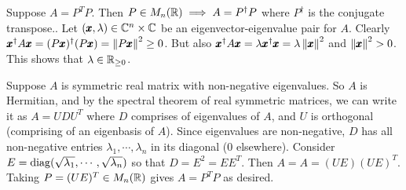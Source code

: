 \begin{sol}
Suppose $A=P^TP$. Then $P\in M_n(\mathbb{R})\implies A=P^\dagger P$ where $P^\dagger$ is the conjugate transpose.. Let $(\pmb x,\lambda)\in\mathbb{C}^n\times \mathbb{C}$ be an eigenvector-eigenvalue pair for $A$. Clearly $\pmb x^\dagger A \pmb x = (P\pmb x)^\dagger (P\pmb x) = \left\| P\pmb x \right\|_{}^2 \geq 0$. But also $\pmb x^\dagger A \pmb x = \lambda \pmb x^\dagger \pmb x = \lambda \left\| \pmb x \right\|_{}^2$ and $\left\| \pmb x \right\|_{}^2> 0$. This shows that $\lambda \in \mathbb{R}_{\geq 0}$.

Suppose $A$ is symmetric real matrix with non-negative eigenvalues. So $A$ is Hermitian, and by the spectral theorem of real symmetric matrices, we can write it as $A=UD U^T$ where $D$ comprises of eigenvalues of $A$, and $U$ is orthogonal (comprising of an eigenbasis of $A$). Since eigenvalues are non-negative, $D$ has all non-negative entries $\lambda_1,\cdots,\lambda_n$ in its diagonal ($0$ elsewhere). Consider $E = \operatorname{diag}(\sqrt{\lambda_1},\cdots,\sqrt{\lambda_n})$ so that $D = E^2 = EE^T$. Then $A = A = (UE)(UE)^T$. Taking $P =(UE)^T\in M_n(\mathbb{R})$ gives $A=P^TP$ as desired.
\end{sol}